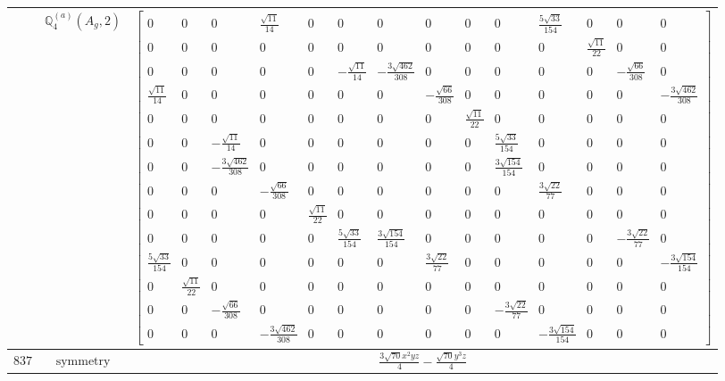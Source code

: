 \documentclass[fleqn,8pt,landscape]{jsarticle}
\begin{document}
\begin{longtable}{ccc}
$  $ & $ \mathbb{Q}_{4}^{(a)}(A_{g},2) $ & $ \begin{bmatrix} 0 & 0 & 0 & \frac{\sqrt{11}}{14} & 0 & 0 & 0 & 0 & 0 & 0 & \frac{5 \sqrt{33}}{154} & 0 & 0 & 0 \\ 0 & 0 & 0 & 0 & 0 & 0 & 0 & 0 & 0 & 0 & 0 & \frac{\sqrt{11}}{22} & 0 & 0 \\ 0 & 0 & 0 & 0 & 0 & - \frac{\sqrt{11}}{14} & - \frac{3 \sqrt{462}}{308} & 0 & 0 & 0 & 0 & 0 & - \frac{\sqrt{66}}{308} & 0 \\ \frac{\sqrt{11}}{14} & 0 & 0 & 0 & 0 & 0 & 0 & - \frac{\sqrt{66}}{308} & 0 & 0 & 0 & 0 & 0 & - \frac{3 \sqrt{462}}{308} \\ 0 & 0 & 0 & 0 & 0 & 0 & 0 & 0 & \frac{\sqrt{11}}{22} & 0 & 0 & 0 & 0 & 0 \\ 0 & 0 & - \frac{\sqrt{11}}{14} & 0 & 0 & 0 & 0 & 0 & 0 & \frac{5 \sqrt{33}}{154} & 0 & 0 & 0 & 0 \\ 0 & 0 & - \frac{3 \sqrt{462}}{308} & 0 & 0 & 0 & 0 & 0 & 0 & \frac{3 \sqrt{154}}{154} & 0 & 0 & 0 & 0 \\ 0 & 0 & 0 & - \frac{\sqrt{66}}{308} & 0 & 0 & 0 & 0 & 0 & 0 & \frac{3 \sqrt{22}}{77} & 0 & 0 & 0 \\ 0 & 0 & 0 & 0 & \frac{\sqrt{11}}{22} & 0 & 0 & 0 & 0 & 0 & 0 & 0 & 0 & 0 \\ 0 & 0 & 0 & 0 & 0 & \frac{5 \sqrt{33}}{154} & \frac{3 \sqrt{154}}{154} & 0 & 0 & 0 & 0 & 0 & - \frac{3 \sqrt{22}}{77} & 0 \\ \frac{5 \sqrt{33}}{154} & 0 & 0 & 0 & 0 & 0 & 0 & \frac{3 \sqrt{22}}{77} & 0 & 0 & 0 & 0 & 0 & - \frac{3 \sqrt{154}}{154} \\ 0 & \frac{\sqrt{11}}{22} & 0 & 0 & 0 & 0 & 0 & 0 & 0 & 0 & 0 & 0 & 0 & 0 \\ 0 & 0 & - \frac{\sqrt{66}}{308} & 0 & 0 & 0 & 0 & 0 & 0 & - \frac{3 \sqrt{22}}{77} & 0 & 0 & 0 & 0 \\ 0 & 0 & 0 & - \frac{3 \sqrt{462}}{308} & 0 & 0 & 0 & 0 & 0 & 0 & - \frac{3 \sqrt{154}}{154} & 0 & 0 & 0 \end{bmatrix} $ \\ \hline
$ 837 $ & $ \text{symmetry} $ & $ \frac{3 \sqrt{70} x^{2} y z}{4} - \frac{\sqrt{70} y^{3} z}{4} $ \\

\end{longtable}
\end{document}
